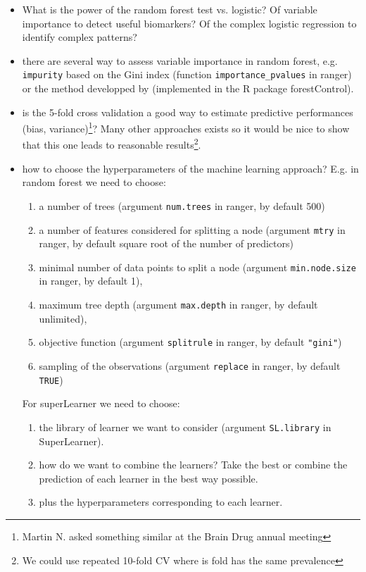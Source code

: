 \documentclass[12pt]{article}
\begin{document}
\begin{itemize}
\item What is the power of the random forest test vs. logistic? \newline Of
variable importance to detect useful biomarkers? \newline Of the complex
logistic regression to identify complex patterns?

\item there are several way to assess variable importance in random
forest, e.g. \texttt{impurity} based on the Gini index (function
\texttt{importance\_pvalues} in ranger) or the method developped by
\cite{konukoglu2014approximate} (implemented in the R package
forestControl).

\item is the 5-fold cross validation a good way to estimate predictive
performances (bias, variance)\footnote{Martin N. asked something similar
at the Brain Drug annual meeting}? Many other approaches exists so
it would be nice to show that this one leads to reasonable
results\footnote{We could use repeated 10-fold CV where is fold has the same prevalence}.

\item how to choose the hyperparameters of the machine learning approach?
E.g. in random forest we need to choose:
\begin{enumerate}
\item a number of trees (argument \texttt{num.trees} in ranger, by default 500)
\item a number of features considered for splitting a node (argument \texttt{mtry} in ranger, by default square root of the number of predictors)
\item minimal number of data points to split a node (argument \texttt{min.node.size} in ranger, by default 1),
\item maximum tree depth (argument \texttt{max.depth} in ranger, by default unlimited),
\item objective function (argument \texttt{splitrule} in ranger, by default \texttt{"gini"})
\item sampling of the observations (argument \texttt{replace} in ranger, by default \texttt{TRUE})
\end{enumerate}
For superLearner we need to choose:
\begin{enumerate}
\item the library of learner we want to consider (argument
\texttt{SL.library} in SuperLearner).
\item how do we want to combine the learners? Take the best or
combine the prediction of each learner in the best way
possible.
\item plus the hyperparameters corresponding to each learner.
\end{enumerate}
\end{itemize}
\end{document}
